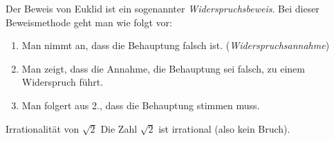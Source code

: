 \clearpage
Der Beweis von Euklid ist ein sogenannter \textit{Widerspruchsbeweis}. Bei dieser Beweismethode geht man wie folgt vor:

\begin{enumerate}
    \item Man nimmt an, dass die Behauptung falsch ist. (\textit{Widerspruchsannahme})
    \item Man zeigt, dass die Annahme, die Behauptung sei falsch, zu einem Widerspruch führt.
    \item Man folgert aus 2., dass die Behauptung stimmen muss.
\end{enumerate}

\begin{satz}{Irrationalität von \(\sqrt{2}\)}{}
    Die Zahl \(\sqrt{2}\) ist irrational (also kein Bruch).
\end{satz}








\clearpage

